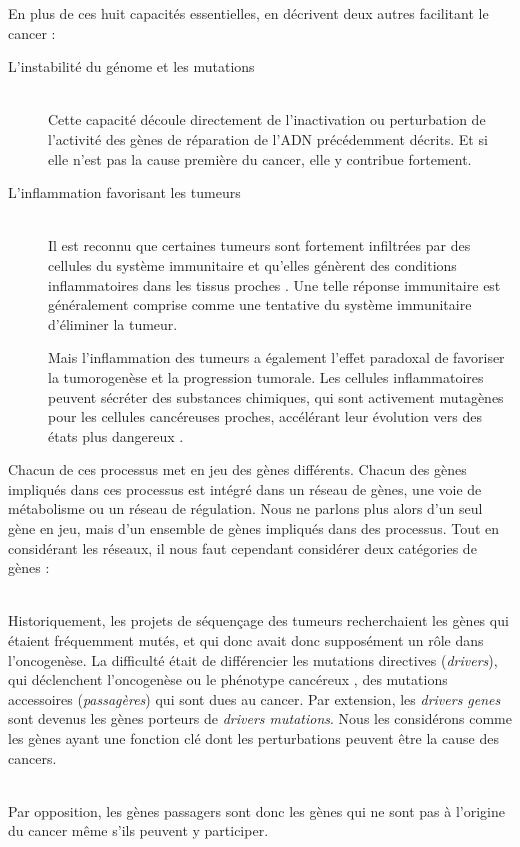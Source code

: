 			En plus de ces huit capacités essentielles, \citeauthor{Hanahan2011} en décrivent deux autres facilitant le cancer :
			\begin{description}
				\item [L'instabilité du génome et les mutations]    \hfill \\
					Cette capacité découle directement de l'inactivation ou perturbation de l'activité des gènes de réparation de l'\acs{ADN} précédemment décrits.
					Et si elle n'est pas la cause première du cancer, elle y contribue fortement.

			\pagebreak

				\item [L'inflammation favorisant les tumeurs]       \hfill \\
					Il est reconnu que certaines tumeurs sont fortement infiltrées par des cellules du système immunitaire et qu'elles génèrent des conditions inflammatoires dans les tissus proches \citep{Dvorak1986}.
					Une telle réponse immunitaire est généralement comprise comme une tentative du système immunitaire d'éliminer la tumeur.

					Mais l'inflammation des tumeurs a également l'effet paradoxal de favoriser la tumorogenèse et la progression tumorale.
					Les cellules inflammatoires peuvent sécréter des substances chimiques, qui sont activement mutagènes pour les cellules cancéreuses proches, accélérant leur évolution vers des états plus dangereux \citep{Grivennikov2010}.
			\end{description}

			Chacun de ces processus met en jeu des gènes différents.
			Chacun des gènes impliqués dans ces processus est intégré dans un réseau de gènes, une voie de métabolisme ou un réseau de régulation.
			Nous ne parlons plus alors d'un seul gène en jeu, mais d'un ensemble de gènes impliqués dans des processus.
			Tout en considérant les réseaux, il nous faut cependant considérer deux catégories de gènes :
			\begin{description}\label{def:genes}
				\item [Les gènes directeurs (\emph{drivers genes})]    \hfill \\
					Historiquement, les projets de séquençage des tumeurs recherchaient les gènes qui étaient fréquemment mutés, et qui donc avait donc supposément un rôle dans l'oncogenèse.
					La difficulté était de différencier les mutations directives (\emph{drivers}), qui déclenchent l'oncogenèse ou le phénotype cancéreux \citep{Greenman2006, Sjoblom2006, Wood2007}, des mutations accessoires (\emph{passagères}) qui sont dues au cancer.
					Par extension, les \emph{drivers genes} sont devenus les gènes porteurs de \emph{drivers mutations}.
					Nous les considérons comme les gènes ayant une fonction clé dont les perturbations peuvent être la cause des cancers.
				\item [Les gènes passagers (\emph{passengers genes})] \hfill \\
					Par opposition, les gènes passagers sont donc les gènes qui ne sont pas à l'origine du cancer même s'ils peuvent y participer.
			\end{description}

